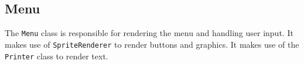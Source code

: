 \subsection{Menu}

The \texttt{Menu} class is responsible for rendering the menu and handling user input.
It makes use of \texttt{SpriteRenderer} to render buttons and graphics.
It makes use of the \texttt{Printer} class to render text.